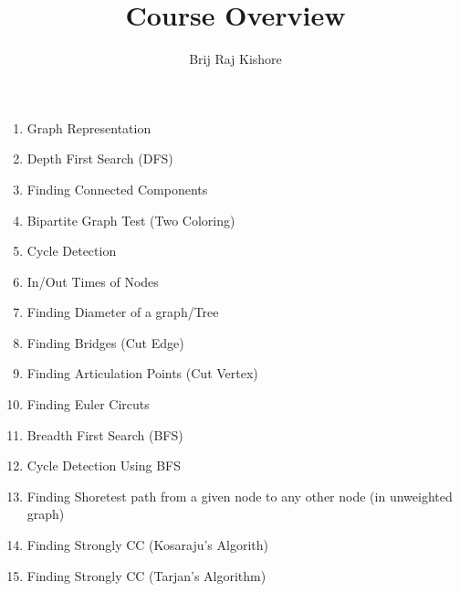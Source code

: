 \documentclass[12pt,twocolumn]{article}
\title{Course Overview}
\date{}
\author{Brij Raj Kishore}
\begin{document}
	\maketitle
		\begin{enumerate}
			\item Graph Representation
			\item Depth First Search (DFS)
			\item Finding Connected Components
			\item Bipartite Graph Test (Two Coloring)
			\item Cycle Detection
			\item In/Out Times of Nodes
			\item Finding Diameter of a graph/Tree
			\item Finding Bridges (Cut Edge)
			\item Finding Articulation Points (Cut Vertex)
			\item Finding Euler Circuts 
			\item Breadth First Search (BFS)
			\item Cycle Detection Using BFS
			\item Finding Shoretest path from a given node to any other node (in unweighted graph)
			\item Finding Strongly CC (Kosaraju's Algorith)
			\item Finding Strongly CC (Tarjan's Algorithm)
			
			
		\end{enumerate}
\end{document}
